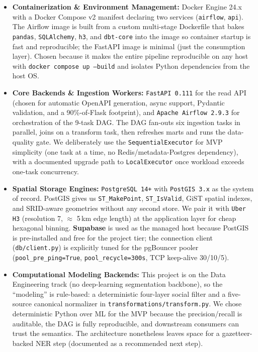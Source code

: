 \documentclass[11pt,a4paper]{article}
\begin{document}
\begin{itemize}
    \item \textbf{Containerization \& Environment Management:} Docker Engine
    24.x with a Docker Compose v2 manifest declaring two services
    (\texttt{airflow}, \texttt{api}). The Airflow image is built from a
    custom multi-stage Dockerfile that bakes \texttt{pandas},
    \texttt{SQLAlchemy}, \texttt{h3}, and \texttt{dbt-core} into the image
    so container startup is fast and reproducible; the FastAPI image is
    minimal (just the consumption layer). Chosen because it makes the entire
    pipeline reproducible on any host with \texttt{docker compose up
    --build} and isolates Python dependencies from the host OS.

    \item \textbf{Core Backends \& Ingestion Workers:} \texttt{FastAPI 0.111}
    for the read API (chosen for automatic OpenAPI generation, async
    support, Pydantic validation, and a 90\%-of-Flask footprint), and
    \texttt{Apache Airflow 2.9.3} for orchestration of the 9-task DAG. The
    DAG fan-outs six ingestion tasks in parallel, joins on a transform
    task, then refreshes marts and runs the data-quality gate. We
    deliberately use the \texttt{SequentialExecutor} for MVP simplicity
    (one task at a time, no Redis/metadata-Postgres dependency), with a
    documented upgrade path to \texttt{LocalExecutor} once workload exceeds
    one-task concurrency.

    \item \textbf{Spatial Storage Engines:} \texttt{PostgreSQL 14+} with
    \texttt{PostGIS 3.x} as the system of record. PostGIS gives us
    \texttt{ST\_MakePoint}, \texttt{ST\_IsValid}, GiST spatial indexes, and
    SRID-aware geometries without any second store. We pair it with
    \texttt{Uber H3} (resolution 7, $\approx$ 5\,km edge length) at the
    application layer for cheap hexagonal binning. \textbf{Supabase} is
    used as the managed host because PostGIS is pre-installed and free for
    the project tier; the connection client (\texttt{db/client.py}) is
    explicitly tuned for the pgBouncer pooler (\texttt{pool\_pre\_ping=True},
    \texttt{pool\_recycle=300s}, TCP keep-alive 30/10/5).

    \item \textbf{Computational Modeling Backends:} This project is on the
    Data Engineering track (no deep-learning segmentation backbone), so
    the ``modeling'' is rule-based: a deterministic four-layer social
    filter and a five-source canonical normalizer in
    \texttt{transformations/transform.py}. We chose deterministic Python
    over ML for the MVP because the precision/recall is auditable, the
    DAG is fully reproducible, and downstream consumers can trust the
    semantics. The architecture nonetheless leaves space for a
    gazetteer-backed NER step (documented as a recommended next step).


\end{itemize}
\end{document}
